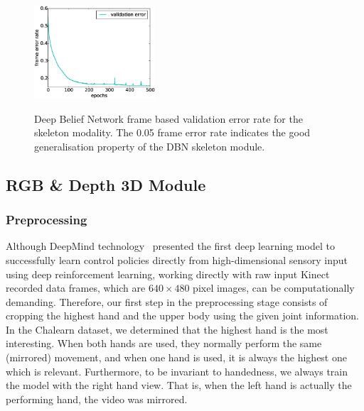 
\begin{figure}[t]
  \centering
  \includegraphics[width=0.4\textwidth]{images/training_error_sk}\\
  \caption{
    Deep Belief Network frame based validation error rate for the skeleton modality.
    The 0.05 frame error rate indicates the good generalisation property of the DBN skeleton module.
    }
    \label{sk_error_rate}
\end{figure}

\subsection{RGB \& Depth 3D Module} \label{sec:rgbd_modules}
\subsubsection{Preprocessing}\label{3d_preproc}

Although DeepMind technology~\cite{mnih2013playing} presented the first deep learning model to successfully learn control policies directly from high-dimensional sensory input using deep reinforcement learning, working directly with raw input Kinect recorded data frames, which are $640 \times 480$ pixel images, can be computationally demanding.
Therefore, our first step in the preprocessing stage consists of cropping the highest hand and the upper body using the given joint information. In the Chalearn dataset, we determined that the highest hand is the most interesting. When both hands are used, they normally perform the same (mirrored) movement, and when one hand is used, it is always the highest one which is relevant.
Furthermore, to be invariant to handedness, we always train the model with the right hand view. 
That is, when the left hand is actually the performing hand, the video was mirrored.


